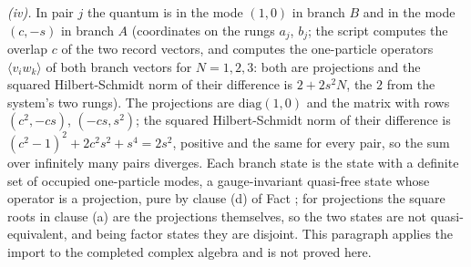 \emph{(iv).} In pair $j$ the quantum is in the mode $(1, 0)$ in branch $B$ and in the mode $(c, -s)$ in branch $A$ (coordinates on the rungs $a_{j}$, $b_{j}$; the script computes the overlap $c$ of the two record vectors, and computes the one-particle operators $\langle v_{i}w_{k}\rangle$ of both branch vectors for $N = 1, 2, 3$: both are projections and the squared Hilbert-Schmidt norm of their difference is $2 + 2s^{2}N$, the $2$ from the system's two rungs). The projections are $\mathrm{diag}(1, 0)$ and the matrix with rows $(c^{2}, -cs)$, $(-cs, s^{2})$; the squared Hilbert-Schmidt norm of their difference is $(c^{2} - 1)^{2} + 2c^{2}s^{2} + s^{4} = 2s^{2}$, positive and the same for every pair, so the sum over infinitely many pairs diverges. Each branch state is the state with a definite set of occupied one-particle modes, a gauge-invariant quasi-free state whose operator is a projection, pure by clause (d) of Fact ; for projections the square roots in clause (a) are the projections themselves, so the two states are not quasi-equivalent, and being factor states they are disjoint. This paragraph applies the import to the completed complex algebra and is not proved here.
